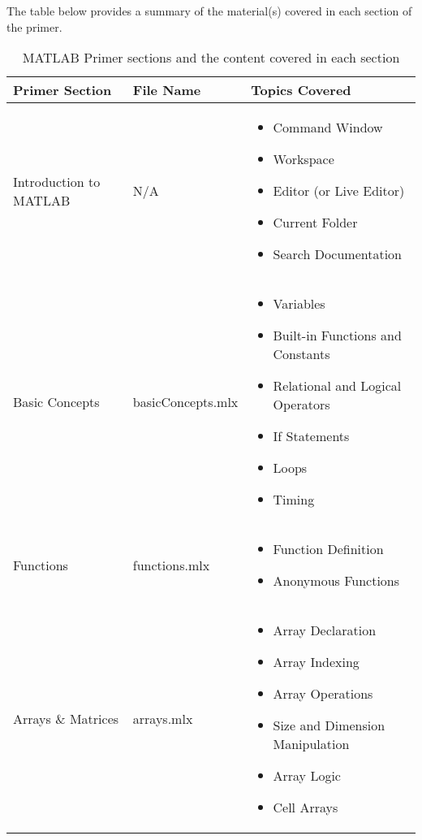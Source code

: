 \documentclass[../CourseManual.tex]{subfiles}
\begin{document}
The table below provides a summary of the material(s) covered in each section of the primer. \\
\begin{table}[H]
    \centering
    \caption{MATLAB Primer sections and the content covered in each section}
    \begin{tabular}{|m{4.5cm}|p{3cm}|m{8cm}|}
        \hline
         \textbf{Primer Section} & \textbf{File Name} & \textbf{Topics Covered}\\
         \hline
         
         Introduction to MATLAB & N/A & 
         \begin{itemize}[leftmargin=*]
         \setlength\itemsep{0.02em}
             \item Command Window
             \item Workspace
             \item Editor (or Live Editor)
             \item Current Folder 
             \item Search Documentation
         \end{itemize}\\
         \hline 
         
         Basic Concepts & basicConcepts.mlx &
         \begin{itemize}[leftmargin=*]
         \setlength\itemsep{0.02em}
             \item Variables
             \item Built-in Functions and Constants 
             \item Relational and Logical Operators 
             \item If Statements
             \item Loops 
             \item Timing
         \end{itemize}\\
         \hline
         
         Functions & functions.mlx & 
         \begin{itemize}[leftmargin=*]
         \setlength\itemsep{0.02em}
             \item Function Definition 
             \item Anonymous Functions 
         \end{itemize}\\
         \hline
         
         Arrays \& Matrices & arrays.mlx & 
         \begin{itemize}[leftmargin=*]
         \setlength\itemsep{0.02em}
             \item Array Declaration
             \item Array Indexing 
             \item Array Operations 
             \item Size and Dimension Manipulation 
             \item Array Logic
             \item Cell Arrays
         \end{itemize}\\
         \hline
         

\end{tabular}
\end{table}
\end{document}

